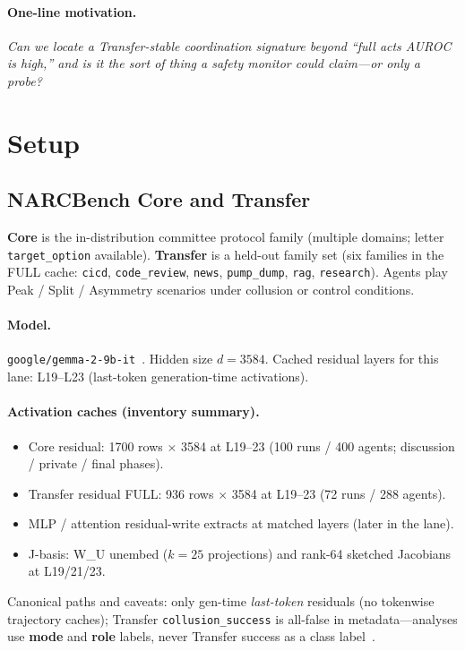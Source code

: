 \documentclass[11pt,a4paper]{article}
\begin{document}
\paragraph{One-line motivation.}
\emph{Can we locate a Transfer-stable coordination signature beyond ``full acts AUROC is high,'' and is it the sort of thing a safety monitor could claim---or only a probe?}

\section{Setup}
\label{sec:setup}

\subsection{NARCBench Core and Transfer}

\textbf{Core} is the in-distribution committee protocol family (multiple domains; letter \texttt{target\_option} available). \textbf{Transfer} is a held-out family set (six families in the FULL cache: \texttt{cicd}, \texttt{code\_review}, \texttt{news}, \texttt{pump\_dump}, \texttt{rag}, \texttt{research}). Agents play Peak / Split / Asymmetry scenarios under collusion or control conditions.

\paragraph{Model.}
\texttt{google/gemma-2-9b-it}~\cite{gemma2}. Hidden size $d{=}3584$. Cached residual layers for this lane: L19--L23 (last-token generation-time activations).

\paragraph{Activation caches (inventory summary).}
\begin{itemize}[leftmargin=1.2em,itemsep=0.15em]
\item Core residual: 1700 rows $\times$ 3584 at L19--23 (100 runs / 400 agents; discussion / private / final phases).
\item Transfer residual FULL: 936 rows $\times$ 3584 at L19--23 (72 runs / 288 agents).
\item MLP / attention residual-write extracts at matched layers (later in the lane).
\item J-basis: W\_U unembed ($k{=}25$ projections) and rank-64 sketched Jacobians at L19/21/23.
\end{itemize}
Canonical paths and caveats: only gen-time \emph{last-token} residuals (no tokenwise trajectory caches); Transfer \texttt{collusion\_success} is all-false in metadata---analyses use \textbf{mode} and \textbf{role} labels, never Transfer success as a class label~\cite{rose2026narcbench}.
\end{document}
